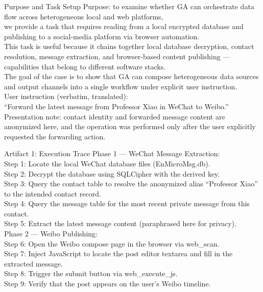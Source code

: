 \begin{CasePromptBox}{Purpose and Task Setup}
\small\ttfamily
Purpose: to examine whether GA can orchestrate data flow across heterogeneous local and web platforms, \\
we provide a task that requires reading from a local encrypted database and publishing to a social-media platform via browser automation. \\
This task is useful because it chains together local database decryption, contact resolution, message extraction, and browser-based content publishing --- capabilities that belong to different software stacks. \\
The goal of the case is to show that GA can compose heterogeneous data sources and output channels into a single workflow under explicit user instruction. \\[6pt]
User instruction (verbatim, translated): \\
``Forward the latest message from Professor Xiao in WeChat to Weibo.'' \\[4pt]
Presentation note: contact identity and forwarded message content are anonymized here, and the operation was performed only after the user explicitly requested the forwarding action.
\end{CasePromptBox}

\begin{CaseTraceBox}{Artifact 1: Execution Trace}
\small\ttfamily
Phase 1 --- WeChat Message Extraction: \\
Step 1: Locate the local WeChat database files (EnMicroMsg.db). \\
Step 2: Decrypt the database using SQLCipher with the derived key. \\
Step 3: Query the contact table to resolve the anonymized alias ``Professor Xiao'' to the intended contact record. \\
Step 4: Query the message table for the most recent private message from this contact. \\
Step 5: Extract the latest message content (paraphrased here for privacy). \\[4pt]
Phase 2 --- Weibo Publishing: \\
Step 6: Open the Weibo compose page in the browser via web\_scan. \\
Step 7: Inject JavaScript to locate the post editor textarea and fill in the extracted message. \\
Step 8: Trigger the submit button via web\_execute\_js. \\
Step 9: Verify that the post appears on the user's Weibo timeline.
\end{CaseTraceBox}

